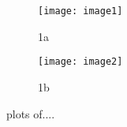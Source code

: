 \documentclass{article}
\begin{document}
\begin{figure}
  \begin{subfigure}{.5\textwidth}
    \centering
    \texttt{[image: image1]}
    \caption{1a}
    \label{fig:sfig1}
  \end{subfigure}%
  \begin{subfigure}{.5\textwidth}
    \centering
    \texttt{[image: image2]}
    \caption{1b}
    \label{fig:sfig2}
  \end{subfigure}
  \caption{plots of....}
  \label{fig:fig}
\end{figure}
\end{document}
